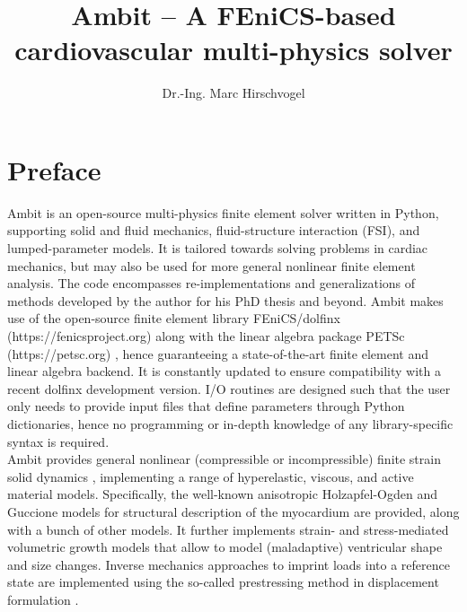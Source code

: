 \documentclass[a4paper,12pt]{report}
\begin{document}
\title{Ambit -- A FEniCS-based cardiovascular multi-physics solver}
\author{Dr.-Ing. Marc Hirschvogel}

\maketitle

\tableofcontents

\section{Preface}

Ambit \cite{hirschvogel2024-ambit} is an open-source multi-physics finite element solver written in Python, supporting solid and fluid mechanics, fluid-structure interaction (FSI), and lumped-parameter models. It is tailored towards solving problems in cardiac mechanics, but may also be used for more general nonlinear finite element analysis. The code encompasses re-implementations and generalizations of methods developed by the author for his PhD thesis \cite{hirschvogel2019disspub} and beyond. Ambit makes use of the open-source finite element library FEniCS/dolfinx (https://fenicsproject.org) \cite{logg2012-fenics} along with the linear algebra package PETSc (https://petsc.org) \cite{balay2022-petsc}, hence guaranteeing a state-of-the-art finite element and linear algebra backend. It is constantly updated to ensure compatibility with a recent dolfinx development version. I/O routines are designed such that the user only needs to provide input files that define parameters through Python dictionaries, hence no programming or in-depth knowledge of any library-specific syntax is required.\\

Ambit provides general nonlinear (compressible or incompressible) finite strain solid dynamics \cite{holzapfel2000}, implementing a range of hyperelastic, viscous, and active material models. Specifically, the well-known anisotropic Holzapfel-Ogden \cite{holzapfel2009} and Guccione models \cite{guccione1995} for structural description of the myocardium are provided, along with a bunch of other models. It further implements strain- and stress-mediated volumetric growth models \cite{goektepe2010} that allow to model (maladaptive) ventricular shape and size changes. Inverse mechanics approaches to imprint loads into a reference state are implemented using the so-called prestressing method \cite{gee2010} in displacement formulation \cite{schein2021}.\\
\end{document}
